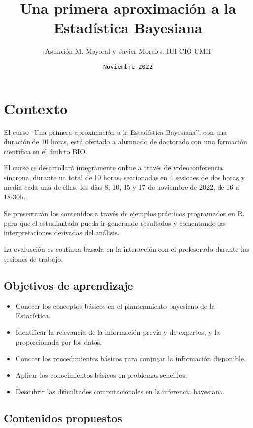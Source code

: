 \documentclass[
]{book}
\title{Una primera aproximación a la Estadística Bayesiana}
\author{Asunción M. Mayoral y Javier Morales. IUI CIO-UMH}
\date{\texttt{Noviembre\ 2022}}
\providecommand{\tightlist}{%
  \setlength{\itemsep}{0pt}\setlength{\parskip}{0pt}}
\begin{document}
\maketitle

{
\setcounter{tocdepth}{1}
\tableofcontents
}
\hypertarget{contexto}{%
\chapter{Contexto}\label{contexto}}

El curso ``Una primera aproximación a la Estadística Bayesiana'', con una duración de 10 horas, está ofertado a alumnado de doctorado con una formación científica en el ámbito BIO.

El curso se desarrollará íntegramente online a través de videoconferencia síncrona, durante un total de 10 horas, seccionadas en 4 sesiones de dos horas y media cada una de ellas, los días 8, 10, 15 y 17 de noviembre de 2022, de 16 a 18:30h.

Se presentarán los contenidos a través de ejemplos prácticos programados en R, para que el estudiantado pueda ir generando resultados y comentando las interpretaciones derivadas del análisis.

La evaluación es continua basada en la interacción con el profesorado durante las sesiones de trabajo.

\hypertarget{objetivos-de-aprendizaje}{%
\section{Objetivos de aprendizaje}\label{objetivos-de-aprendizaje}}

\begin{itemize}
\tightlist
\item
  Conocer los conceptos básicos en el planteamiento bayesiano de la Estadística.
\item
  Identificar la relevancia de la información previa y de expertos, y la proporcionada por los datos.
\item
  Conocer los procedimientos básicos para conjugar la información disponible.
\item
  Aplicar los conocimientos básicos en problemas sencillos.
\item
  Descubrir las dificultades computacionales en la inferencia bayesiana.
\end{itemize}

\hypertarget{contenidos-propuestos}{%
\section{Contenidos propuestos}\label{contenidos-propuestos}}
\end{document}
